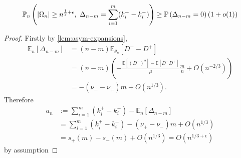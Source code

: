 \documentclass[draft]{scrartcl}
\newcommand{\E}{\mathbb E}
\newcommand{\littleo}{o}
\newcommand{\bigo}{O}
\newcommand{\defeq}{:=}
\DeclarePairedDelimiter{\abs}{\lvert}{\rvert}
\begin{document}
\begin{lemma}
    \label{lem:mod-dev-local}
    \begin{equation}
        \mathbb P_n \left( \abs{\Omega_n} \geq n^{\frac{1}{2} + \epsilon},\ \Delta_{n-m} = \sum_{i=1}^m (k_i^+ - k_i^-) \right)
        \geq \mathbb P \left( \Delta_{n-m} = 0 \right) (1 + \littleo(1))
    \end{equation}
\end{lemma}
\begin{proof}
    Firstly by \cref{lem:asym-expansions},
    \begin{align}
        \E_n[\Delta_{n-m}]
        &= (n - m) \E_{\theta_n}[D^- - D^+] \\ 
        &= (n - m) \left(-\frac{\E[(D^-)^2] - \E[D^- D^+]}{\mu} \frac{m}{n} + \bigo(n^{-2/3}) \right) \\
        &= -(\nu_- - \nu_+)m + \bigo(n^{1/3}).
    \end{align}
    Therefore 
    \begin{align}
        a_n
        &\defeq \sum_{i=1}^m (k_i^+ - k_i^-) - \E_n[\Delta_{n-m}] \\
        &= \sum_{i=1}^m (k_i^+ - k_i^-) - (\nu_+ - \nu_-)m + \bigo(n^{1/3}) \\
        &= s_+(m) - s_-(m) + \bigo(n^{1/3}) = \bigo(n^{1/3 + \epsilon})
    \end{align}
    by assumption


\end{proof}
\end{document}
